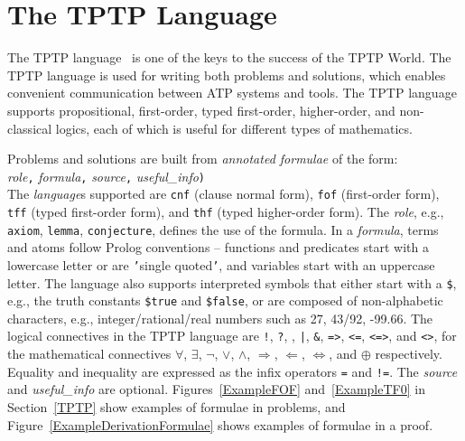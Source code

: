 \documentclass[runningheads]{llncs}
\newcommand{\smalltt}[1]{\small \texttt{#1}}
\begin{document}
\section{The TPTP Language}
\label{Languages}

The TPTP language~\cite{Sut23-IGPL} is one of the keys to the success of the TPTP World.
The TPTP language is used for writing both problems and solutions,
which enables convenient communication between ATP systems and tools.
The TPTP language supports propositional, first-order, typed first-order, higher-order, and
non-classical logics, each of which is useful for different types of mathematics.

Problems and solutions are built from {\em annotated formulae} of the form: \\
{\em role}{\tt ,}
{\em formula}{\tt ,}
{\em source}{\tt ,}
{\em useful\_info}{\tt )}\\
The {\em language}s supported are {\smalltt{cnf}} (clause normal form), {\smalltt{fof}}
(first-order form), {\smalltt{tff}} (typed first-order form), and {\smalltt{thf}}
(typed higher-order form).
The {\em role}, e.g., {\smalltt{axiom}}, {\smalltt{lemma}}, {\smalltt{conjecture}}, defines the 
use of the formula.
In a {\em formula}, terms and atoms follow Prolog conventions -- functions and predicates start 
with a lowercase letter or are {\tt '}single quoted{\tt '}, and variables start with an uppercase 
letter.
The language also supports interpreted symbols that either start with a {\tt \$}, e.g., the 
truth constants {\smalltt{\$true}} and {\smalltt{\$false}}, or are composed of 
non-alphabetic characters, e.g., integer/rational/real numbers such as 27, 43/92, -99.66.
The logical connectives in the TPTP language are
{\tt !}, {\tt ?}, {\tt {\raisebox{0.4ex}{\texttildelow}}}, {\tt |}, {\tt \&}, {\tt =>}, {\tt <=},
{\tt <=>}, and {\tt <{\raisebox{0.4ex}{\texttildelow}}>},
for the mathematical connectives
$\forall$, $\exists$, $\neg$, $\vee$, $\wedge$, $\Rightarrow$, $\Leftarrow$, $\Leftrightarrow$, 
and $\oplus$ respectively.
Equality and inequality are expressed as the infix operators {\tt =} and {\tt !=}.
The {\em source} and {\em useful\_info} are optional.
Figures~\ref{ExampleFOF} and~\ref{ExampleTF0} in Section~\ref{TPTP} show examples of formulae in
problems, and Figure~\ref{ExampleDerivationFormulae} shows examples of formulae in a proof.

\end{document}
